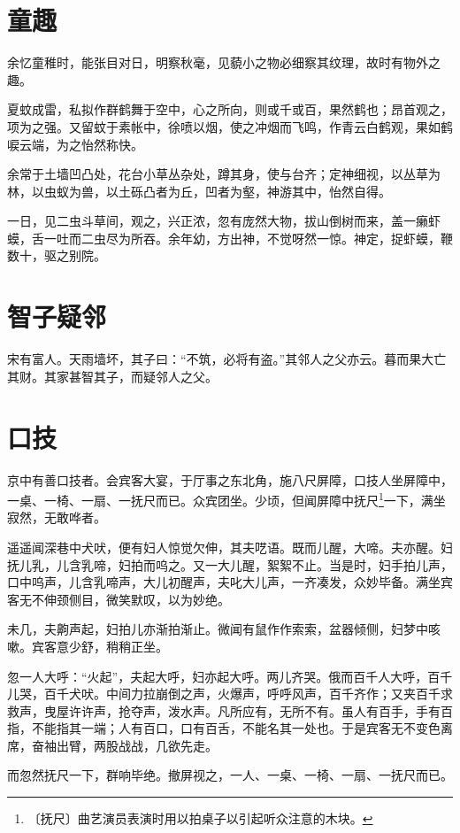 \documentclass[12pt,UTF-8,openany]{ctexbook}
\begin{document}
\chapter{童趣}

\begin{normalsize}
    
    余忆童稚时，能张目对日，明察秋毫，见藐小之物必细察其纹理，故时有物外之趣。
    
    夏蚊成雷，私拟作群鹤舞于空中，心之所向，则或千或百，果然鹤也；昂首观之，项为之强。又留蚊于素帐中，徐喷以烟，使之冲烟而飞鸣，作青云白鹤观，果如鹤唳云端，为之怡然称快。
    
    余常于土墙凹凸处，花台小草丛杂处，蹲其身，使与台齐；定神细视，以丛草为林，以虫蚁为兽，以土砾凸者为丘，凹者为壑，神游其中，怡然自得。
    
    一日，见二虫斗草间，观之，兴正浓，忽有庞然大物，拔山倒树而来，盖一癞虾蟆，舌一吐而二虫尽为所吞。余年幼，方出神，不觉呀然一惊。神定，捉虾蟆，鞭数十，驱之别院。
\end{normalsize}



\chapter{智子疑邻}

\begin{normalsize}
    
    宋有富人。天雨墙坏，其子曰：“不筑，必将有盗。”其邻人之父亦云。暮而果大亡其财。其家甚智其子，而疑邻人之父。
\end{normalsize}



\chapter{口技}

\begin{normalsize}
    
    京中有善口技者。会宾客大宴，于厅事之东北角，施八尺屏障，口技人坐屏障中，一桌、一椅、一扇、一抚尺而已。众宾团坐。少顷，但闻屏障中抚尺\footnote{〔抚尺〕曲艺演员表演时用以拍桌子以引起听众注意的木块。}一下，满坐寂然，无敢哗者。
    
    遥遥闻深巷中犬吠，便有妇人惊觉欠伸，其夫呓语。既而儿醒，大啼。夫亦醒。妇抚儿乳，儿含乳啼，妇拍而呜之。又一大儿醒，絮絮不止。当是时，妇手拍儿声，口中呜声，儿含乳啼声，大儿初醒声，夫叱大儿声，一齐凑发，众妙毕备。满坐宾客无不伸颈侧目，微笑默叹，以为妙绝。
    
    未几，夫齁声起，妇拍儿亦渐拍渐止。微闻有鼠作作索索，盆器倾侧，妇梦中咳嗽。宾客意少舒，稍稍正坐。
    
    忽一人大呼：“火起”，夫起大呼，妇亦起大呼。两儿齐哭。俄而百千人大呼，百千儿哭，百千犬吠。中间力拉崩倒之声，火爆声，呼呼风声，百千齐作；又夹百千求救声，曳屋许许声，抢夺声，泼水声。凡所应有，无所不有。虽人有百手，手有百指，不能指其一端；人有百口，口有百舌，不能名其一处也。于是宾客无不变色离席，奋袖出臂，两股战战，几欲先走。
    
    而忽然抚尺一下，群响毕绝。撤屏视之，一人、一桌、一椅、一扇、一抚尺而已。
\end{normalsize}
\end{document}
